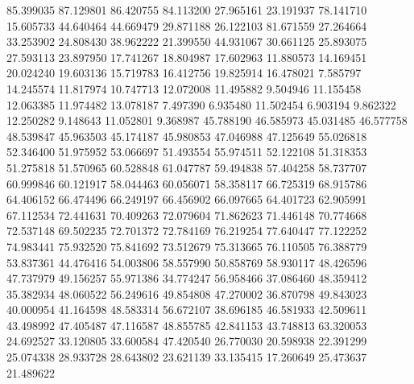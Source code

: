 85.399035
87.129801
86.420755
84.113200
27.965161
23.191937
78.141710
15.605733
44.640464
44.669479
29.871188
26.122103
81.671559
27.264664
33.253902
24.808430
38.962222
21.399550
44.931067
30.661125
25.893075
27.593113
23.897950
17.741267
18.804987
17.602963
11.880573
14.169451
20.024240
19.603136
15.719783
16.412756
19.825914
16.478021
7.585797
14.245574
11.817974
10.747713
12.072008
11.495882
9.504946
11.155458
12.063385
11.974482
13.078187
7.497390
6.935480
11.502454
6.903194
9.862322
12.250282
9.148643
11.052801
9.368987
45.788190
46.585973
45.031485
46.577758
48.539847
45.963503
45.174187
45.980853
47.046988
47.125649
55.026818
52.346400
51.975952
53.066697
51.493554
55.974511
52.122108
51.318353
51.275818
51.570965
60.528848
61.047787
59.494838
57.404258
58.737707
60.999846
60.121917
58.044463
60.056071
58.358117
66.725319
68.915786
64.406152
66.474496
66.249197
66.456902
66.097665
64.401723
62.905991
67.112534
72.441631
70.409263
72.079604
71.862623
71.446148
70.774668
72.537148
69.502235
72.701372
72.784169
76.219254
77.640447
77.122252
74.983441
75.932520
75.841692
73.512679
75.313665
76.110505
76.388779
53.837361
44.476416
54.003806
58.557990
50.858769
58.930117
48.426596
47.737979
49.156257
55.971386
34.774247
56.958466
37.086460
48.359412
35.382934
48.060522
56.249616
49.854808
47.270002
36.870798
49.843023
40.000954
41.164598
48.583314
56.672107
38.696185
46.581933
42.509611
43.498992
47.405487
47.116587
48.855785
42.841153
43.748813
63.320053
24.692527
33.120805
33.600584
47.420540
26.770030
20.598938
22.391299
25.074338
28.933728
28.643802
23.621139
33.135415
17.260649
25.473637
21.489622
